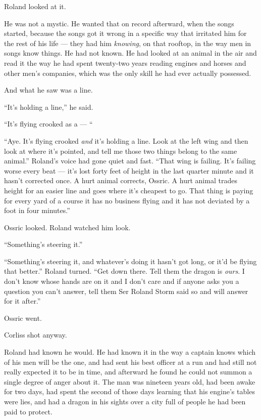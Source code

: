 \sceneBreak

Roland looked at it.

He was not a mystic. He wanted that on record afterward, when the songs started, because the songs got it wrong in a specific way that irritated him for the rest of his life — they had him \textit{knowing}, on that rooftop, in the way men in songs know things. He had not known. He had looked at an animal in the air and read it the way he had spent twenty-two years reading engines and horses and other men’s companies, which was the only skill he had ever actually possessed.

And what he saw was a line.

“It’s holding a line,” he said.

“It’s flying crooked as a — “

“Aye. It’s flying crooked \textit{and} it’s holding a line. Look at the left wing and then look at where it’s pointed, and tell me those two things belong to the same animal.” Roland’s voice had gone quiet and fast. “That wing is failing. It’s failing worse every beat — it’s lost forty feet of height in the last quarter minute and it hasn’t corrected once. A hurt animal corrects, Ossric. A hurt animal trades height for an easier line and goes where it’s cheapest to go. That thing is paying for every yard of a course it has no business flying and it has not deviated by a foot in four minutes.”

Ossric looked. Roland watched him look.

“Something’s steering it.”

“Something’s steering it, and whatever’s doing it hasn’t got long, or it’d be flying that better.” Roland turned. “Get down there. Tell them the dragon is \textit{ours}. I don’t know whose hands are on it and I don’t care and if anyone asks you a question you can’t answer, tell them Ser Roland Storm said so and will answer for it after.”

Ossric went.

\sceneBreak

Corliss shot anyway.

Roland had known he would. He had known it in the way a captain knows which of his men will be the one, and had sent his best officer at a run and had still not really expected it to be in time, and afterward he found he could not summon a single degree of anger about it. The man was nineteen years old, had been awake for two days, had spent the second of those days learning that his engine’s tables were lies, and had a dragon in his sights over a city full of people he had been paid to protect.

